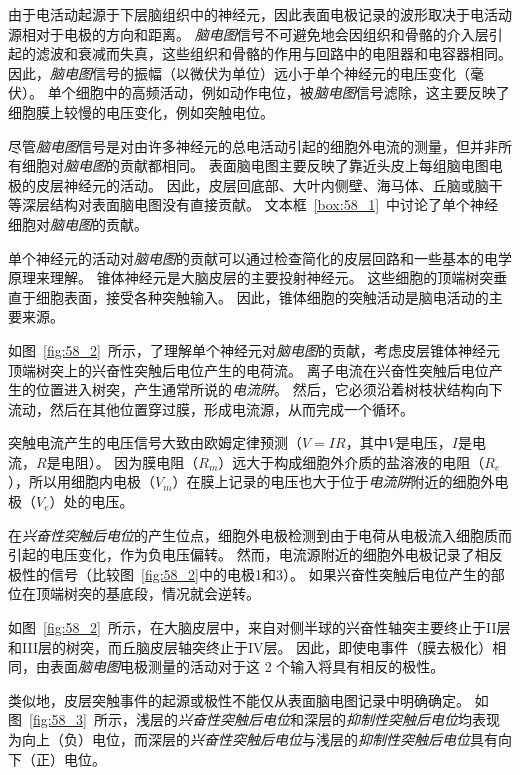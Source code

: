 由于电活动起源于下层脑组织中的神经元，因此表面电极记录的波形取决于电活动源相对于电极的方向和距离。
\textit{脑电图}信号不可避免地会因组织和骨骼的介入层引起的滤波和衰减而失真，这些组织和骨骼的作用与回路中的电阻器和电容器相同。
因此，\textit{脑电图}信号的振幅（以微伏为单位）远小于单个神经元的电压变化（毫伏）。
单个细胞中的高频活动，例如动作电位，被\textit{脑电图}信号滤除，这主要反映了细胞膜上较慢的电压变化，例如突触电位。


尽管\textit{脑电图}信号是对由许多神经元的总电活动引起的细胞外电流的测量，但并非所有细胞对\textit{脑电图}的贡献都相同。
表面脑电图主要反映了靠近头皮上每组脑电图电极的皮层神经元的活动。
因此，皮层回底部、大叶内侧壁、海马体、丘脑或脑干等深层结构对表面脑电图没有直接贡献。
文本框~\ref{box:58_1}~中讨论了单个神经细胞对\textit{脑电图}的贡献。


\begin{proposition}[单个神经元对脑电图的贡献] \label{box:58_1}
	
	\quad \quad 单个神经元的活动对\textit{脑电图}的贡献可以通过检查简化的皮层回路和一些基本的电学原理来理解。
	锥体神经元是大脑皮层的主要投射神经元。
	这些细胞的顶端树突垂直于细胞表面，接受各种突触输入。
	因此，锥体细胞的突触活动是脑电活动的主要来源。
	
	\quad \quad 如图~\ref{fig:58_2}~所示，了理解单个神经元对\textit{脑电图}的贡献，考虑皮层锥体神经元顶端树突上的兴奋性突触后电位产生的电荷流。
	离子电流在兴奋性突触后电位产生的位置进入树突，产生通常所说的\textit{电流阱}。
	然后，它必须沿着树枝状结构向下流动，然后在其他位置穿过膜，形成电流源，从而完成一个循环。
	
	\quad \quad 突触电流产生的电压信号大致由欧姆定律预测（$ V=IR $，其中$ V $是电压，$ I $是电流，$ R $是电阻）。
	因为膜电阻（$R_m$）远大于构成细胞外介质的盐溶液的电阻（$ R_e $），所以用细胞内电极（$ V_m $）在膜上记录的电压也大于位于\textit{电流阱}附近的细胞外电极（$ V_e $）处的电压。
	
	\quad \quad 在\textit{兴奋性突触后电位}的产生位点，细胞外电极检测到由于电荷从电极流入细胞质而引起的电压变化，作为负电压偏转。
	然而，电流源附近的细胞外电极记录了相反极性的信号（比较图~\ref{fig:58_2}中的电极1和3）。
	如果兴奋性突触后电位产生的部位在顶端树突的基底段，情况就会逆转。
	
	\quad \quad 如图~\ref{fig:58_2}~所示，在大脑皮层中，来自对侧半球的兴奋性轴突主要终止于II层和III层的树突，而丘脑皮层轴突终止于IV层。
	因此，即使电事件（膜去极化）相同，由表面\textit{脑电图}电极测量的活动对于这 2 个输入将具有相反的极性。
	
	\quad \quad 类似地，皮层突触事件的起源或极性不能仅从表面脑电图记录中明确确定。
	如图~\ref{fig:58_3}~所示，浅层的\textit{兴奋性突触后电位}和深层的\textit{抑制性突触后电位}均表现为向上（负）电位，而深层的\textit{兴奋性突触后电位}与浅层的\textit{抑制性突触后电位}具有向下（正）电位。
	
\end{proposition}


